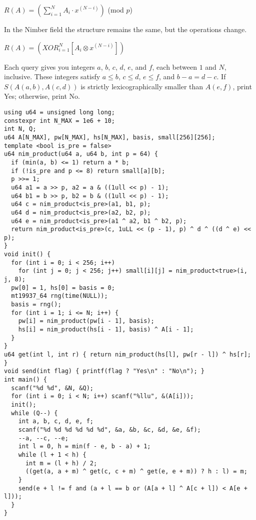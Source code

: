 \begin{center}
  $\displaystyle R(A) = \left( \sum_{i = 1}^{N} A_i \cdot x^{(N - i)} \right)$ (mod $p$)
\end{center}

In the Nimber field the structure remains the same, but the operations change.

\begin{center}
  $\displaystyle R(A) = \left( {XOR}_{i = 1}^{N} \left[A_i \otimes x^{(N - i)} \right] \right)$
\end{center}

Each query gives you integers $a$, $b$, $c$, $d$, $e$, and $f$, each between $1$ and $N$, inclusive.
These integers satisfy $a \leq b$, $c \leq d$, $e \leq f$, and $b-a = d-c$. If $S(A(a,b),A(c,d))$ is strictly
lexicographically smaller than $A(e,f)$, print Yes; otherwise, print No.

\begin{lstlisting}
using u64 = unsigned long long;
constexpr int N_MAX = 1e6 + 10;
int N, Q;
u64 A[N_MAX], pw[N_MAX], hs[N_MAX], basis, small[256][256];
template <bool is_pre = false>
u64 nim_product(u64 a, u64 b, int p = 64) {
  if (min(a, b) <= 1) return a * b;
  if (!is_pre and p <= 8) return small[a][b];
  p >>= 1;
  u64 a1 = a >> p, a2 = a & ((1ull << p) - 1);
  u64 b1 = b >> p, b2 = b & ((1ull << p) - 1);
  u64 c = nim_product<is_pre>(a1, b1, p);
  u64 d = nim_product<is_pre>(a2, b2, p);
  u64 e = nim_product<is_pre>(a1 ^ a2, b1 ^ b2, p);
  return nim_product<is_pre>(c, 1uLL << (p - 1), p) ^ d ^ ((d ^ e) << p);
}
void init() {
  for (int i = 0; i < 256; i++)
    for (int j = 0; j < 256; j++) small[i][j] = nim_product<true>(i, j, 8);
  pw[0] = 1, hs[0] = basis = 0;
  mt19937_64 rng(time(NULL));
  basis = rng();
  for (int i = 1; i <= N; i++) {
    pw[i] = nim_product(pw[i - 1], basis);
    hs[i] = nim_product(hs[i - 1], basis) ^ A[i - 1];
  }
}
u64 get(int l, int r) { return nim_product(hs[l], pw[r - l]) ^ hs[r]; }
void send(int flag) { printf(flag ? "Yes\n" : "No\n"); }
int main() {
  scanf("%d %d", &N, &Q);
  for (int i = 0; i < N; i++) scanf("%llu", &(A[i]));
  init();
  while (Q--) {
    int a, b, c, d, e, f;
    scanf("%d %d %d %d %d %d", &a, &b, &c, &d, &e, &f);
    --a, --c, --e;
    int l = 0, h = min(f - e, b - a) + 1;
    while (l + 1 < h) {
      int m = (l + h) / 2;
      ((get(a, a + m) ^ get(c, c + m) ^ get(e, e + m)) ? h : l) = m;
    }
    send(e + l != f and (a + l == b or (A[a + l] ^ A[c + l]) < A[e + l]));
  }
}
\end{lstlisting}